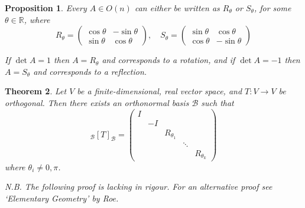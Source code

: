 \documentclass[10pt,fleqn]{article}
\newcommand{\reals}{\mathbb{R}}
\newcommand{\basis}{\mathcal{B}}
\theoremstyle{definition} \newtheorem{defn}{Definition}[section]
\theoremstyle{plain}      \newtheorem{thm}[defn]{Theorem}
\theoremstyle{plain}      \newtheorem{prop}[defn]{Proposition}
\theoremstyle{plain}      \newtheorem{lem}[defn]{Lemma}
\theoremstyle{plain}      \newtheorem{cor}[defn]{Corollary}
\theoremstyle{plain}      \newtheorem{ad}[defn]{Addendum}
\theoremstyle{definition} \newtheorem{ex}[defn]{Example}
\theoremstyle{definition} \newtheorem{rem}[defn]{Remark}
\numberwithin{equation}{subsection}
\begin{document}
\begin{prop}\label{rotation-matrices}
    Every $A\in O(n)$ can either be written as $R_{\theta}$ or $S_{\theta}$, for some $\theta\in\reals$, where
    \[
        R_{\theta}=
        \left(
        \begin{array}{rr}
            \cos\theta&-\sin\theta\\
            \sin\theta&\cos\theta
        \end{array}
        \right),\quad
        S_{\theta}=
        \left(
        \begin{array}{rr}
            \sin\theta&\cos\theta\\
            \cos\theta&-\sin\theta
        \end{array}
        \right)
    \]

    If $\det A=1$ then $A=R_{\theta}$ and corresponds to a rotation, and if $\det A=-1$ then $A=S_{\theta}$ and corresponds to a reflection.
\end{prop}

\begin{thm}
    Let $V$ be a finite-dimensional, real vector space, and $T:V\to V$ be orthogonal.
    Then there exists an orthonormal basis $\basis$ such that
    \[
        _{\basis}[T]_{\basis}=
        \left(
        \begin{array}{ccccc}
            I&&&&\\
            &-I&&&\\
            &&R_{\theta_1}&&\\
            &&&\ddots&\\
            &&&&R_{\theta_k}
        \end{array}
        \right)
    \]
    where $\theta_i\neq0,\pi$.
\end{thm}

\emph{N.B. The following proof is lacking in rigour. For an alternative proof see `Elementary Geometry' by Roe.}
\end{document}

